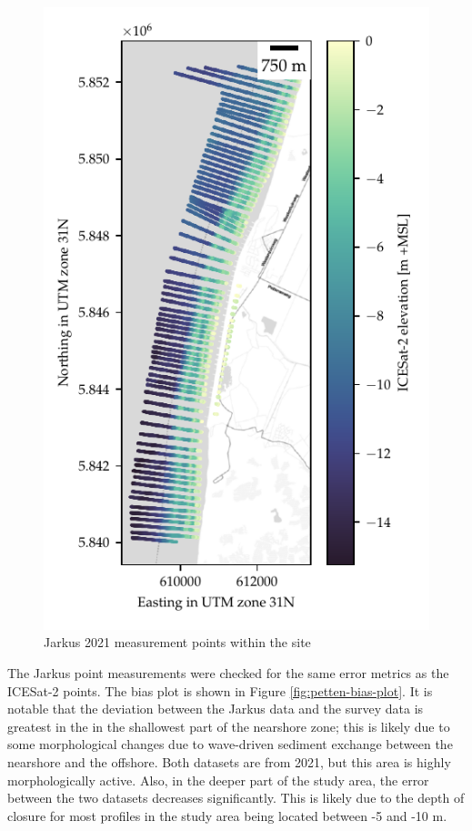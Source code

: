 \begin{figure}[ht]
    \centering
    \includegraphics[]{figures/Petten_photon_map.pdf}
    \caption{Jarkus 2021 measurement points within the site}\label{fig:jarkus-points}
\end{figure}


The Jarkus point measurements were checked for the same error metrics as the ICESat-2 points. The bias plot is shown in Figure \ref{fig:petten-bias-plot}. It is notable that the deviation between the Jarkus data and the survey data is greatest in the in the shallowest part of the nearshore zone; this is likely due to some morphological changes due to wave-driven sediment exchange between the nearshore and the offshore. Both datasets are from 2021, but this area is highly morphologically active. Also, in the deeper part of the study area, the error  between the two datasets decreases significantly. This is likely due to the depth of closure for most profiles in the study area being located between -5 and -10 m.

